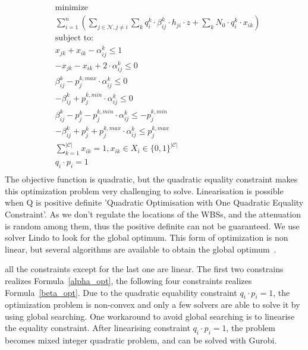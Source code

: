 	\begin{equation}
\label{midp}
			\begin{aligned}
			& \underset{}{\text{minimize}}\\
			&\sum\limits^{n}_{i=1}(\sum\limits_{j\in\mathcal{N}, j\neq i}\sum\limits_k q_{i}^k\cdot \beta_{ij}^k \cdot h_{ji}\cdot z + \sum\limits_k N_0\cdot q_{i}^k\cdot x_{ik})\\
			& \text{subject to:} \\
			& x_{jk} + x_{ik} - \alpha_{ij}^k\leq 1 \\
			& -x_{jk} - x_{ik} +2\cdot \alpha_{ij}^k \leq 0 \\
			& \beta_{ij}^k - p_j^{k,max}\cdot \alpha_{ij}^k \leq 0 \\
			& - \beta_{ij}^k + p_j^{k,min}\cdot \alpha_{ij}^k \leq 0 \\
			& \beta_{ij}^k - p_j^k - p_j^{k,min}\cdot \alpha_{ij}^k \leq -p_j^{k,min} \\			
			& -\beta_{ij}^k + p_j^k + p_j^{k,max}\cdot \alpha_{ij}^k \leq p_j^{k,max} \\			
			& \sum\limits_{k=1}^{|\mathcal{C}|}x_{ik}=1, x_{ik}\in X_i\in \{0,1\}^{|\mathcal{C}|}\\
			& q_i\cdot p_i =1\\
			\end{aligned}
		\end{equation}
The objective function is quadratic, but the quadratic equality constraint makes this optimization problem very challenging to solve.
Linearisation is possible when Q is positive definite 'Quadratic Optimisation with One Quadratic Equality
Constraint'.
As we don't regulate the locations of the WBSs, and the attenuation is random among them, thus the positive definite can not be guaranteed.
We use solver Lindo to look for the global optimum.
This form of optimization is non linear, but several algorithms are available to obtain the global optimum~\cite{hmam2010quadratic,Quadratic_min_one_equality}.		

		all the constraints except for the last one are linear.
The first two constrains realizes Formula~\ref{alpha_opt}, the following four constraints realizes Formula~\ref{beta_opt}.
Due to the quadratic equability constraint $q_i\cdot p_i =1$, the optimization problem is non-convex and only a few solvers are able to solve it by using global searching.
One workaround to avoid global searching is to linearise the equality constraint. 
After linearising constraint $q_i\cdot p_i =1$, the problem becomes mixed integer quadratic problem, and can be solved with Gurobi.


